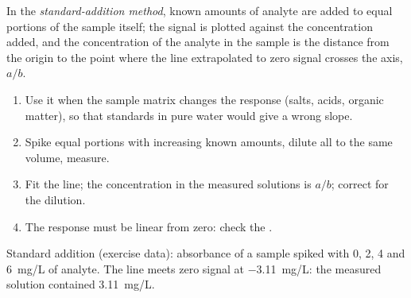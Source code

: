 \begin{definition}\label{def:b2:measurement-statistics:standard-addition}
In the \emph{standard-addition method}, known amounts of analyte are
added to equal portions of the sample itself; the signal is plotted against the concentration added,
and the concentration of the analyte in the sample is the distance from the origin to the point where
the line extrapolated to zero signal crosses the axis, $a/b$.
\end{definition}

\begin{method}\label{met:b2:measurement-statistics:standard-addition}
\begin{enumerate}
  \item Use it when the sample matrix changes the response (salts, acids, organic matter), so that
        standards in pure water would give a wrong slope.
  \item Spike equal portions with increasing known amounts, dilute all to the same volume, measure.
  \item Fit the line; the concentration in the measured solutions is $a/b$; correct for the dilution.
  \item The response must be linear from zero: check the .
\end{enumerate}
\end{method}

\begin{omfigure}

{\small Standard addition (exercise data): absorbance of a sample spiked with 0, 2, 4 and
\qty{6}{mg/L} of analyte. The line meets zero signal at \qty{-3.11}{mg/L}: the measured solution
contained \qty{3.11}{mg/L}.}
\end{omfigure}

